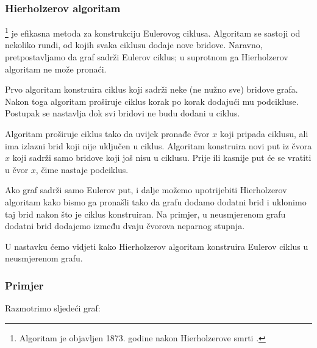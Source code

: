 \subsubsection{Hierholzerov algoritam}


\footnote{Algoritam je objavljen
1873. godine nakon Hierholzerove smrti \cite{hie73}.} je efikasna
metoda za konstrukciju
Eulerovog ciklusa.
Algoritam se sastoji od nekoliko rundi,
od kojih svaka ciklusu dodaje nove bridove.
Naravno, pretpostavljamo da graf sadrži
Eulerov ciklus; u suprotnom ga Hierholzerov
algoritam ne može pronaći.

Prvo algoritam konstruira ciklus koji sadrži
neke (ne nužno sve) bridove grafa.
Nakon toga algoritam proširuje ciklus
korak po korak dodajući mu podcikluse.
Postupak se nastavlja dok svi bridovi ne budu dodani
u ciklus.

Algoritam proširuje ciklus tako da uvijek pronađe
čvor $x$ koji pripada ciklusu, ali ima
izlazni brid koji nije uključen u ciklus.
Algoritam konstruira novi put iz čvora $x$
koji sadrži samo bridove koji još nisu u ciklusu.
Prije ili kasnije
put će se vratiti u čvor $x$,
čime nastaje podciklus.

Ako graf sadrži samo Eulerov put,
i dalje možemo upotrijebiti Hierholzerov algoritam
kako bismo ga pronašli tako da grafu dodamo dodatni brid
i uklonimo taj brid nakon što je ciklus
konstruiran.
Na primjer, u neusmjerenom grafu
dodatni brid dodajemo između dvaju
čvorova neparnog stupnja.

U nastavku ćemo vidjeti kako Hierholzerov algoritam
konstruira Eulerov ciklus u neusmjerenom grafu.

\subsubsection{Primjer}

\begin{samepage}
Razmotrimo sljedeći graf:
\begin{center}
\end{center}
\end{samepage}

